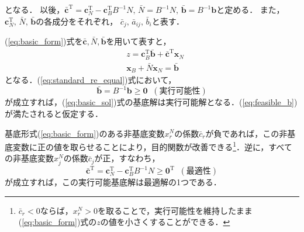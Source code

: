 \documentclass{jsreport}
\begin{document}
となる．
以後，$\bar{\bm{c}}^{\mathrm{T}} = \bm{c}_N^{\mathrm{T}} - \bm{c}_B^{\mathrm{T}}B^{-1}N, \, \bar{N} = B^{-1}N, \, \bar{\bm{b}} = B^{-1}\bm{b}$と定める．
また，$\bm{c}_N^{\mathrm{T}}, \, \bar{N}, \, \bar{\bm{b}}$の各成分をそれぞれ，
$\bar{c}_{j}, \, \bar{a}_{ij}, \, \bar{b}_i$と表す．

(\ref{eq:basic_form})式を$\bar{\bm{c}}, \bar{N}, \bar{\bm{b}}$を用いて表すと，
\begin{align}\label{eq:basic_form_re}
  &z = \bm{c}_B^{\mathrm{T}}\bar{\bm{b}} + \bar{\bm{c}}^{\mathrm{T}}\bm{x}_N \nonumber \\
  &\bm{x}_B + \bar{N}\bm{x}_N = \bar{\bm{b}}
\end{align}
となる．(\ref{eq:standard_re_equal})式において，
\begin{equation}\label{eq:feasible_b}
  \bar{\bm{b}} = B^{-1}\bm{b} \geq \bm{0} \; \; (実行可能性)
\end{equation}
が成立すれば，(\ref{eq:basic_sol})式の基底解は実行可能解となる．(\ref{eq:feasible_b})が満たされると仮定する．

基底形式(\ref{eq:basic_form})のある非基底変数$x_r^N$の係数$\bar{c}_r$が負であれば，この非基底変数に正の値を取らせることにより，目的関数が改善できる\footnote{$\bar{c}_r < 0$ならば，$x_r^N > 0$を取ることで，実行可能性を維持したまま(\ref{eq:basic_form})式の$z$の値を小さくすることができる．}．逆に，すべての非基底変数$x_j^N$の係数$\bar{c}_j$が正，すなわち，
\begin{equation}\label{eq:opt_con}
  \bar{\bm{c}}^{\mathrm{T}} = \bm{c}_N^{\mathrm{T}} - \bm{c}_B^{\mathrm{T}}B^{-1}N \geq \bm{0}^{\mathrm{T}} \; \; (最適性)
\end{equation}
が成立すれば，この実行可能基底解は最適解の1つである．
\end{document}
